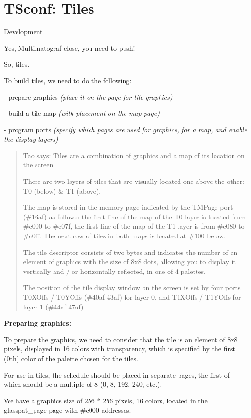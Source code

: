 \documentclass{article}
\begin{document}
\section*{TSconf: Tiles}

Development

Yes, Multimatograf close, you need to push!

So, tiles.

To build tiles, we need to do the following:

- prepare graphics \emph{(place it on the page for tile graphics)}

- build a tile map \emph{(with placement on the map page)}

- program ports \emph{(specify which pages are used for graphics, for
  a map, and enable the display layers)}

\begin{quotation}
  Tao says: Tiles are a combination of graphics and a map of its
  location on the screen.

  There are two layers of tiles that are visually located one above
  the other: T0 (below) \& T1 (above).

  The map is stored in the memory page indicated by the TMPage port
  (\#16af) as follows: the first line of the map of the T0 layer is
  located from \#c000 to \#c07f, the first line of the map of the T1
  layer is from \#c080 to \#c0ff. The next row of tiles in both maps
  is located at \#100 below.

  The tile descriptor consists of two bytes and indicates the number
  of an element of graphics with the size of 8x8 dots, allowing you to
  display it vertically and / or horizontally reflected, in one of 4
  palettes.

  The position of the tile display window on the screen is set by four
  ports T0XOffs / T0YOffs (\#40af-43af) for layer 0, and T1XOffs /
  T1YOffs for layer 1 (\#44af-47af).
\end{quotation}

\textbf{Preparing graphics:}

To prepare the graphics, we need to consider that the tile is an
element of 8x8 pixels, displayed in 16 colors with transparency, which
is specified by the first (0th) color of the palette chosen for the
tiles.

For use in tiles, the schedule should be placed in separate pages, the
first of which should be a multiple of 8 (0, 8, 192, 240, etc.).

We have a graphics size of 256 * 256 pixels, 16 colors, located in the
glasspat\_page page with \#c000 addresses.
\end{document}
